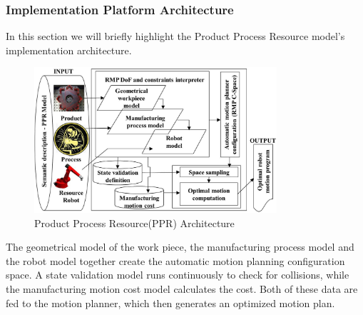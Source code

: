 \subsubsection{Implementation Platform Architecture}
In this section we will briefly highlight the Product Process Resource model's implementation architecture.
\begin{figure}[htbp] %
 \centering
   \includegraphics[width=9cm]{images/ppr_2.png}
   \caption[Product Process Resource(PPR) Architecture]
   { Product Process Resource(PPR) Architecture \footnotemark[\value{footnote}]}  
\label{fig:img8}
\end{figure}

The geometrical model of the work piece, the manufacturing process model and the robot model together create the automatic motion planning configuration space. A state validation model runs continuously to check for collisions, while the manufacturing motion cost model calculates the cost. Both of these data are fed to the motion planner, which then generates an optimized motion plan. 